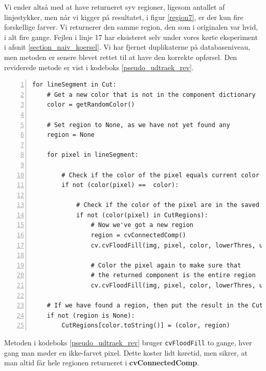 {Vi ender altså med at have returneret syv regioner, ligesom antallet af
linjestykker, men når vi kigger på resultatet, i figur \ref{region7}, er
der kun fire forskellige farver. Vi returnerer den samme region, den som
i originalen var hvid, i alt fire gange.  Fejlen i linje 17 har
eksisteret selv under vores kørte eksperiment i afsnit
\ref{section_naiv_koersel}.  Vi har fjernet duplikaterne på
databaseniveau, men metoden er senere blevet rettet til at have den
korrekte opførsel. Den reviderede metode er vist i kodeboks
\ref{pseudo_udtraek_rev}.

\begin{lstlisting}[caption={Revideret pseudokode til udtrækning af
    regioner. Returnerer ingen
    duplikater.},captionpos=b,label={pseudo_udtraek_rev},numbers=left,
    frame=tb, breaklines=false, float=h]
for lineSegment in Cut:
    # Get a new color that is not in the component dictionary
    color = getRandomColor()

    # Set region to None, as we have not yet found any
    region = None

    for pixel in lineSegment:

        # Check if the color of the pixel equals current color
        if not (color(pixel) ==  color):

            # Check if the color of the pixel are in the saved regions
            if not (color(pixel) in CutRegions):
                # Now we've got a new region
                region = cvConnectedComp()
                cv.cvFloodFill(img, pixel, color, lowerThres, upperThres, region)

                # Color the pixel again to make sure that
                # the returned component is the entire region
                cv.cvFloodFill(img, pixel, color, lowerThres, upperThres, region)

    # If we have found a region, then put the result in the CutRegions-dictionary
    if not (region is None):
        CutRegions[color.toString()] = (color, region)
\end{lstlisting}

Metoden i kodeboks \ref{pseudo_udtraek_rev} bruger \texttt{cvFloodFill}
to gange, hver gang man møder en ikke-farvet pixel. Dette koster lidt
køretid, men sikrer, at man altid får hele regionen returneret i
\textbf{cvConnectedComp}.


}
